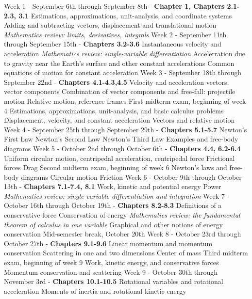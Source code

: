 \documentclass[10pt]{article}
\begin{document}
\begin{outline}[enumerate]
\1 Week 1 - September 6th through September 8th - \textbf{Chapter 1, Chapters 2.1-2.3, 3.1}
\2 Estimations, approximations, unit-analysis, and coordinate systems
\2 Adding and subtracting vectors, displacement and translational motion
\2 \textit{Mathematics review: limits, derivatives, integrals}
\1 Week 2 - September 11th through September 15th - \textbf{Chapters 3.2-3.6}
\2 Instantaneous velocity and acceleration
\3 \textit{Mathematics review: single-variable differentiation}
\2 Accelerration due to gravity near the Earth's surface and other constant accelerations
\2 Common equations of motion for constant acceleration	
\1 Week 3 - September 18th through September 22nd - \textbf{Chapters 4.1-4.3,4.5}
\2 Velocity and acceleration vectors, vector components
\2 Combination of vector components and free-fall: projectile motion
\2 Relative motion, reference frames
\1 First midterm exam, beginning of week 4
\2 Estimations, approximations, unit-analysis, and basic calculus problems
\2 Displacement, velocity, and constant acceleration
\2 Vectors and relative motion
\1 Week 4 - September 25th through September 29th - \textbf{Chapters 5.1-5.7}
\2 Newton's First Law
\2 Newton's Second Law
\2 Newton's Third Law
\2 Examples and free-body diagrams
\1 Week 5 - October 2nd through October 6th - \textbf{Chapters 4.4, 6.2-6.4}
\2 Uniform circular motion, centripedal acceleration, centripedal force
\2 Frictional forces
\2 Drag
\clearpage
\1 Second midterm exam, beginning of week 6
\2 Newton's laws and free-body diagrams
\2 Circular motion
\2 Friction
\1 Week 6 - October 9th through October 13th - \textbf{Chapters 7.1-7.4, 8.1}
\2 Work, kinetic and potential energy
\2 Power
\3 \textit{Mathematics review: single-variable differentiation and integration}
\1 Week 7 - October 16th through October 19th - \textbf{Chapters 8.2-8.3}
\2 Definitions of a conservative force
\2 Conservation of energy
\3 \textit{Mathematics review: the fundamental theorem of calculus in one variable}
\3 Graphical and other notions of energy conservation
\1 Mid-semester break, October 20th
\1 Week 8 - October 23rd through October 27th - \textbf{Chapters 9.1-9.6}
\2 Linear momentum and momentum conservation
\2 Scattering in one and two dimensions
\2 Center of mass
\1 Third midterm exam, beginning of week 9
\2 Work, kinetic energy, and conservative forces
\2 Momentum conservation and scattering
\1 Week 9 - October 30th through November 3rd - \textbf{Chapters 10.1-10.5}
\2 Rotational variables and rotational acceleration
\2 Moments of inertia and rotational kinetic energy

\end{outline}
\end{document}
